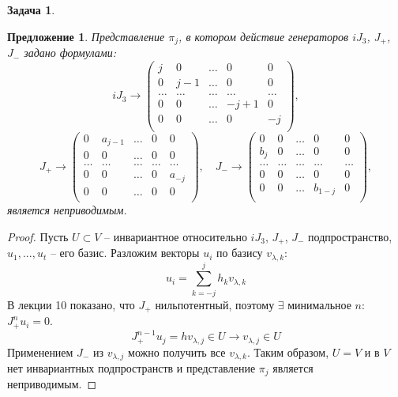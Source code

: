 \documentclass[12pt]{article}
\newtheorem{predl}[theorem]{Предложение}
\theoremstyle{definition}
\newtheorem{zad}{Задача}[section]
\begin{document}
\begin{zad}
\begin{predl}
Представление $\pi_j$, в котором действие генераторов $iJ_3$, $J_+$, $J_-$ задано формулами:
\begin{equation}
    iJ_3\rightarrow\left(
    \begin{array}{ccccc}
    j & 0 & \hdots & 0 & 0\\
    0 & j-1 & \hdots & 0 & 0\\
    \hdots & \hdots & \hdots & \hdots & \hdots\\
    0 & 0 & \hdots & -j+1 & 0\\
    0 & 0 & \hdots & 0 & -j\\
    \end{array}
    \right),
    \end{equation}
    \begin{equation}
    J_+\rightarrow\left(
    \begin{array}{ccccc}
    0 & a_{j-1} & \hdots & 0 & 0\\
    0 & 0 & \hdots & 0 & 0\\
    \hdots & \hdots & \hdots & \hdots & \hdots\\
    0 & 0 & \hdots & 0 & a_{-j}\\
    0 & 0 & \hdots & 0 & 0\\
    \end{array}
    \right),\quad J_-\rightarrow\left(
    \begin{array}{ccccc}
    0 & 0 & \hdots & 0 & 0\\
    b_j & 0 & \hdots & 0 & 0\\
    \hdots & \hdots & \hdots & \hdots & \hdots\\
    0 & 0 & \hdots & 0 & 0\\
    0 & 0 & \hdots & b_{1-j} & 0\\
    \end{array}
    \right),
\end{equation}
является неприводимым.
\end{predl}
\begin{proof}
    Пусть $U\subset V$ -- инвариантное относительно $iJ_3$, $J_+$, $J_-$ подпространство, $u_1,...,u_t$ -- его базис. Разложим векторы $u_i$ по базису $v_{\lambda,k}$:
    \begin{equation}
        u_i=\sum_{k=-j}^jh_kv_{\lambda,k}
    \end{equation}
    В лекции 10 показано, что $J_+$ нильпотентный, поэтому $\exists$ минимальное $n$: $J_+^nu_i=0$.
    \begin{equation}
        J_+^{n-1}u_j=hv_{\lambda,j}\in U\rightarrow v_{\lambda,j}\in U
    \end{equation}
    Применением $J_-$ из $v_{\lambda,j}$ можно получить все $v_{\lambda,k}$. Таким образом, $U=V$ и в $V$ нет инвариантных подпространств и представление $\pi_j$ является неприводимым.
\end{proof}
\end{zad}
\end{document}
